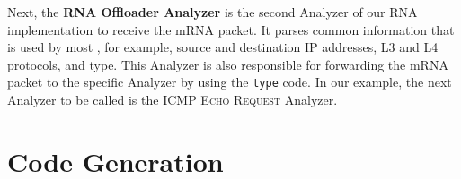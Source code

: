 
Next, the \textbf{RNA Offloader Analyzer} is the second Analyzer of our RNA implementation to receive the mRNA packet. It parses common information that is used by most \Offloaders{}, for example, source and destination IP addresses, L3 and L4 protocols, and \Offloader{} type. This Analyzer is also responsible for forwarding the mRNA packet to the \Offloader{} specific Analyzer by using the \Offloader{} \texttt{type} code. In our example, the next Analyzer to be called is the \textsc{ICMP Echo Request} Analyzer.



\section{Code Generation}
